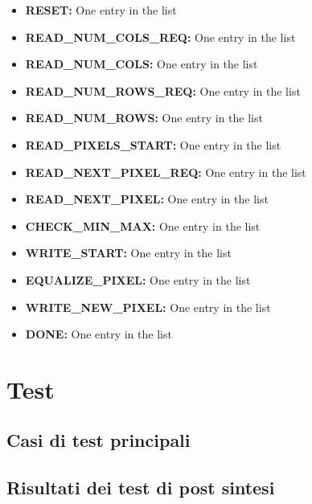 \documentclass{article}
\begin{document}
\begin{itemize}
    \item \textbf{RESET:} One entry in the list
    \item \textbf{READ\_NUM\_COLS\_REQ:} One entry in the list
    \item \textbf{READ\_NUM\_COLS:} One entry in the list
    \item \textbf{READ\_NUM\_ROWS\_REQ:} One entry in the list
    \item \textbf{READ\_NUM\_ROWS:} One entry in the list
    \item \textbf{READ\_PIXELS\_START:} One entry in the list
    \item \textbf{READ\_NEXT\_PIXEL\_REQ:} One entry in the list
    \item \textbf{READ\_NEXT\_PIXEL:} One entry in the list
    \item \textbf{CHECK\_MIN\_MAX:} One entry in the list
    \item \textbf{WRITE\_START:} One entry in the list
    \item \textbf{EQUALIZE\_PIXEL:} One entry in the list
    \item \textbf{WRITE\_NEW\_PIXEL:} One entry in the list
    \item \textbf{DONE:} One entry in the list
\end{itemize}

\section{Test}
\subsection{Casi di test principali}
\subsection{Risultati dei test di post sintesi}
\end{document}
